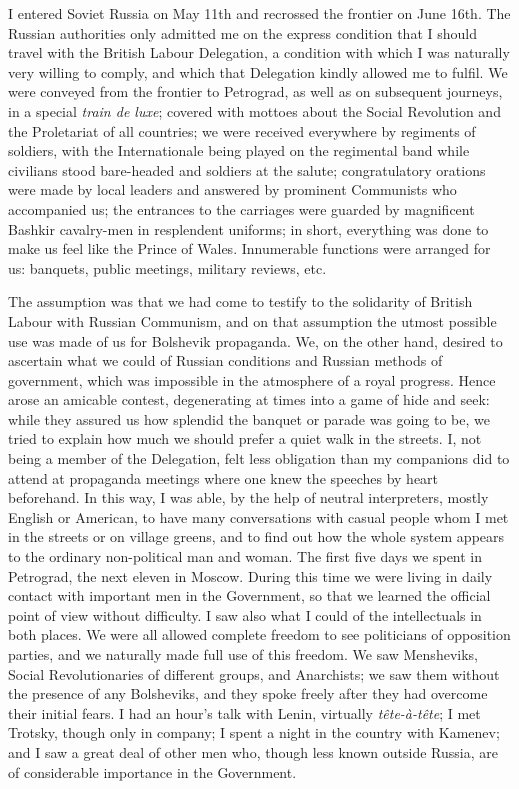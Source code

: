I entered Soviet Russia on May 11th and recrossed the frontier on June 16th. The Russian authorities only admitted me on the express condition that I should travel with the British Labour Delegation, a condition with which I was naturally very willing to comply, and which that Delegation kindly allowed me to fulfil. We were conveyed from the frontier to Petrograd, as well as on subsequent journeys, in a special \emph{train de luxe}; covered with mottoes about the Social Revolution and the Proletariat of all countries; we were received everywhere by regiments of soldiers, with the Internationale being played on the regimental band while civilians stood bare-headed and soldiers at the salute; congratulatory orations were made by local leaders and answered by prominent Communists who accompanied us; the entrances to the carriages were guarded by magnificent Bashkir cavalry-men in resplendent uniforms; in short, everything was done to make us feel like the Prince of Wales. Innumerable functions were arranged for us: banquets, public meetings, military reviews, etc.

The assumption was that we had come to testify to the solidarity of British Labour with Russian Communism, and on that assumption the utmost possible use was made of us for Bolshevik propaganda. We, on the other hand, desired to ascertain what we could of Russian conditions and Russian methods of government, which was impossible in the atmosphere of a royal progress. Hence arose an amicable contest, degenerating at times into a game of hide and seek: while they assured us how splendid the banquet or parade was going to be, we tried to explain how much we should prefer a quiet walk in the streets. I, not being a member of the Delegation, felt less obligation than my companions did to attend at propaganda meetings where one knew the speeches by heart beforehand. In this way, I was able, by the help of neutral interpreters, mostly English or American, to have many conversations with casual people whom I met in the streets or on village greens, and to find out how the whole system appears to the ordinary non-political man and woman. The first five days we spent in Petrograd, the next eleven in Moscow. During this time we were living in daily contact with important men in the Government, so that we learned the official point of view without difficulty. I saw also what I could of the intellectuals in both places. We were all allowed complete freedom to see politicians of opposition parties, and we naturally made full use of this freedom. We saw Mensheviks, Social Revolutionaries of different groups, and Anarchists; we saw them without the presence of any Bolsheviks, and they spoke freely after they had overcome their initial fears. I had an hour's talk with Lenin, virtually \emph{tête-à-tête}; I met Trotsky, though only in company; I spent a night in the country with Kamenev; and I saw a great deal of other men who, though less known outside Russia, are of considerable importance in the Government.

